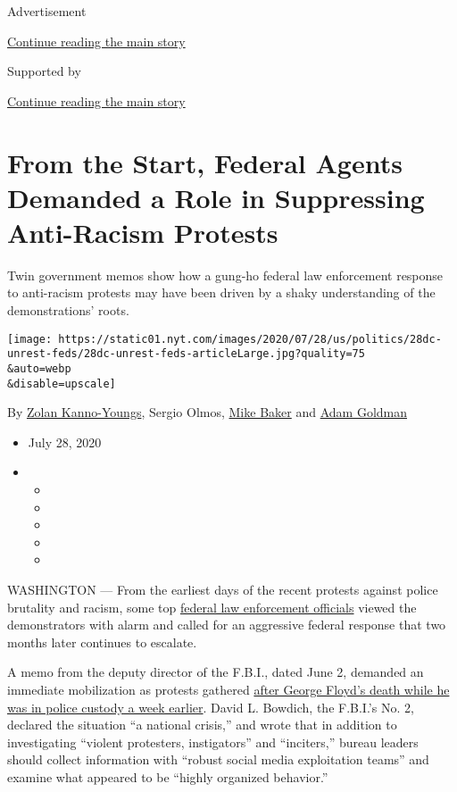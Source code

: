 Advertisement

\protect\hyperlink{after-top}{Continue reading the main story}

Supported by

\protect\hyperlink{after-sponsor}{Continue reading the main story}

\hypertarget{from-the-start-federal-agents-demanded-a-role-in-suppressing-anti-racism-protests}{%
\section{From the Start, Federal Agents Demanded a Role in Suppressing
Anti-Racism
Protests}\label{from-the-start-federal-agents-demanded-a-role-in-suppressing-anti-racism-protests}}

Twin government memos show how a gung-ho federal law enforcement
response to anti-racism protests may have been driven by a shaky
understanding of the demonstrations' roots.

\texttt{[image: https://static01.nyt.com/images/2020/07/28/us/politics/28dc-unrest-feds/28dc-unrest-feds-articleLarge.jpg?quality=75\\\&auto=webp\\\&disable=upscale]}

By \href{https://www.nytimes.com/by/zolan-kanno-youngs}{Zolan
Kanno-Youngs}, Sergio Olmos,
\href{https://www.nytimes.com/by/mike-baker}{Mike Baker} and
\href{https://www.nytimes.com/by/adam-goldman}{Adam Goldman}

\begin{itemize}
\item
  July 28, 2020
\item
  \begin{itemize}
  \item
  \item
  \item
  \item
  \item
  \end{itemize}
\end{itemize}

WASHINGTON --- From the earliest days of the recent protests against
police brutality and racism, some top
\href{https://www.nytimes.com/2020/07/30/nyregion/nypd-protester-van.html}{federal
law enforcement officials} viewed the demonstrators with alarm and
called for an aggressive federal response that two months later
continues to escalate.

A memo from the deputy director of the F.B.I., dated June 2, demanded an
immediate mobilization as protests gathered
\href{https://www.nytimes.com/2020/05/31/us/george-floyd-investigation.html}{after
George Floyd's death while he was in police custody a week earlier}.
David L. Bowdich, the F.B.I.'s No. 2, declared the situation ``a
national crisis,'' and wrote that in addition to investigating ``violent
protesters, instigators'' and ``inciters,'' bureau leaders should
collect information with ``robust social media exploitation teams'' and
examine what appeared to be ``highly organized behavior.''

